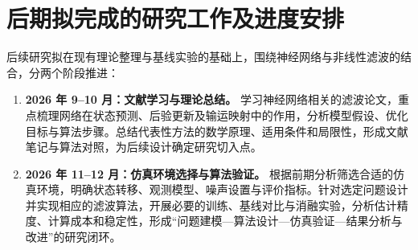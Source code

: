 \section{后期拟完成的研究工作及进度安排}

后续研究拟在现有理论整理与基线实验的基础上，围绕神经网络与非线性滤波的结合，分两个阶段推进：

\begin{enumerate}[label=(\arabic*),leftmargin=2.5em,topsep=3pt,itemsep=6pt,parsep=0pt]
  \item \textbf{2026 年 9--10 月：文献学习与理论总结。}
  学习神经网络相关的滤波论文，重点梳理网络在状态预测、后验更新及输运映射中的作用，分析模型假设、优化目标与算法步骤。总结代表性方法的数学原理、适用条件和局限性，形成文献笔记与算法对照，为后续设计确定研究切入点。
  \item \textbf{2026 年 11--12 月：仿真环境选择与算法验证。}
  根据前期分析筛选合适的仿真环境，明确状态转移、观测模型、噪声设置与评价指标。针对选定问题设计并实现相应的滤波算法，开展必要的训练、基线对比与消融实验，分析估计精度、计算成本和稳定性，形成“问题建模—算法设计—仿真验证—结果分析与改进”的研究闭环。
\end{enumerate}
